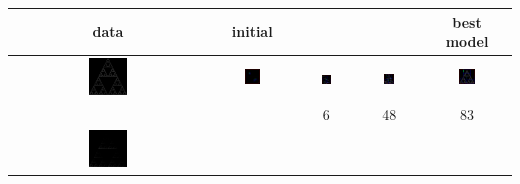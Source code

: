 \documentclass[10pt,a4paper,oneside]{article}
\theoremstyle{definition}
\begin{document}
\begin{table}[p]
\begin{tabular}{c c c c c}
\hline
data & initial & & & best model \\
\hline
    \includegraphics[width=0.2\textwidth]{../img/runs2d/sierpinski/data.png}
& 
    \includegraphics[width=0.2\textwidth]{../img/runs2d/sierpinski/generation0000.png}
& 
    \includegraphics[width=0.2\textwidth]{../img/runs2d/sierpinski/generation0001.png}
& 
    \includegraphics[width=0.2\textwidth]{../img/runs2d/sierpinski/generation0010.png}
& 
    \includegraphics[width=0.2\textwidth]{../img/runs2d/sierpinski/generation0032.png}
\\
 & & 6 & 48 & 83 \\
    \includegraphics[width=0.2\textwidth]{../img/runs2d/sierpinskioff/data.png}

\end{tabular}
\end{table}
\end{document}
